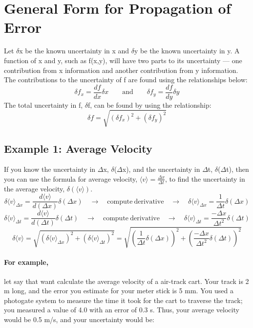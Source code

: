 \section*{General Form for Propagation of Error}
Let $\delta$x be the known uncertainty in x and $\delta$y be the known uncertainty in y. 
A function of x and y, such as f(x,y), will have two parts to its uncertainty — one contribution from x information and another contribution from y information. 
The contributions to the uncertainty of f are found using the relationships below:
\[ \delta f_{x} = \frac{df}{dx} \delta x \qquad \mathrm{and} \qquad \delta f_{y} = \frac{df}{dy} \delta y \]
The total uncertainty in f, $\delta$f, can be found by using the relationship:
\begin{equation}
\delta f = \sqrt{(\delta f_{x})^{2}+(\delta f_{y})^{2}}
\end{equation}

\subsection*{Example 1: Average Velocity}
If you know the uncertainty in $\Delta$x, $\delta$($\Delta$x), and the uncertainty in $\Delta$t, $\delta$($\Delta$t), then you can use the formula for average velocity, $\langle v \rangle = \frac{\Delta x}{\Delta t}$, to find the uncertainty in the average velocity, $ \delta (\langle v \rangle)$.
\[ \delta \langle v \rangle_{\Delta x} = \frac{d \langle v \rangle}{d(\Delta x)} \delta (\Delta x)
   \quad \rightarrow \quad \mathrm{compute \ derivative} \quad \rightarrow \quad
   \delta \langle v \rangle_{\Delta x} = \frac{1}{\Delta t} \delta (\Delta x)\]
%
\[ \delta \langle v \rangle_{\Delta t} = \frac{d \langle v \rangle}{d(\Delta t)} \delta (\Delta t)
   \quad \rightarrow \quad \mathrm{compute \ derivative} \quad \rightarrow \quad
   \delta \langle v \rangle_{\Delta t} = \frac{-\Delta x}{\Delta t^{2}} \delta (\Delta t)\]
%
\[ \delta \langle v \rangle = \sqrt{(\delta \langle v \rangle_{\Delta x})^{2} 
   + (\delta \langle v \rangle_{\Delta t})^{2}} = \sqrt{\left(\frac{1}{\Delta t} \delta (\Delta x)\right)^{2} + \left(\frac{-\Delta x}{\Delta t^{2}} \delta (\Delta t)\right)^{2}} \]

\paragraph{For example,} let say that want calculate the average velocity of a air-track cart. Your track is 2 m long, and the error you estimate for your meter stick is 5 mm. You used a photogate system to measure the time it took for the cart to traverse the track; you measured a value of 4.0  with an error of 0.3 s. Thus, your average velocity would be 0.5 m/s, and your uncertainty would be:

